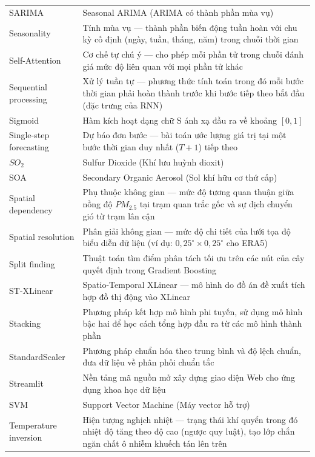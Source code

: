\begin{longtable}{p{4.2cm} p{10.3cm}}
    SARIMA & Seasonal ARIMA (ARIMA có thành phần mùa vụ) \\
    Seasonality & Tính mùa vụ --- thành phần biến động tuần hoàn với chu kỳ cố định (ngày, tuần, tháng, năm) trong chuỗi thời gian \\
    Self-Attention & Cơ chế tự chú ý --- cho phép mỗi phần tử trong chuỗi đánh giá mức độ liên quan với mọi phần tử khác \\
    Sequential processing & Xử lý tuần tự --- phương thức tính toán trong đó mỗi bước thời gian phải hoàn thành trước khi bước tiếp theo bắt đầu (đặc trưng của RNN) \\
    Sigmoid & Hàm kích hoạt dạng chữ S ánh xạ đầu ra về khoảng $[0, 1]$ \\
    Single-step forecasting & Dự báo đơn bước --- bài toán ước lượng giá trị tại một bước thời gian duy nhất ($T{+}1$) tiếp theo \\
    $SO_2$ & Sulfur Dioxide (Khí lưu huỳnh dioxit) \\
    SOA & Secondary Organic Aerosol (Sol khí hữu cơ thứ cấp) \\
    Spatial dependency & Phụ thuộc không gian --- mức độ tương quan thuận giữa nồng độ $PM_{2.5}$ tại trạm quan trắc gốc và sự dịch chuyển gió từ trạm lân cận \\
    Spatial resolution & Phân giải không gian --- mức độ chi tiết của lưới tọa độ biểu diễn dữ liệu (ví dụ: $0{,}25^\circ \times 0{,}25^\circ$ cho ERA5) \\
    Split finding & Thuật toán tìm điểm phân tách tối ưu trên các nút của cây quyết định trong Gradient Boosting \\
    ST-XLinear & Spatio-Temporal XLinear --- mô hình do đồ án đề xuất tích hợp đồ thị động vào XLinear \\
    Stacking & Phương pháp kết hợp mô hình phi tuyến, sử dụng mô hình bậc hai để học cách tổng hợp đầu ra từ các mô hình thành phần \\
    StandardScaler & Phương pháp chuẩn hóa theo trung bình và độ lệch chuẩn, đưa dữ liệu về phân phối chuẩn tắc \\
    Streamlit & Nền tảng mã nguồn mở xây dựng giao diện Web cho ứng dụng khoa học dữ liệu \\
    SVM & Support Vector Machine (Máy vector hỗ trợ) \\
    Temperature inversion & Hiện tượng nghịch nhiệt --- trạng thái khí quyển trong đó nhiệt độ tăng theo độ cao (ngược quy luật), tạo lớp chắn ngăn chất ô nhiễm khuếch tán lên trên \\

\end{longtable}
